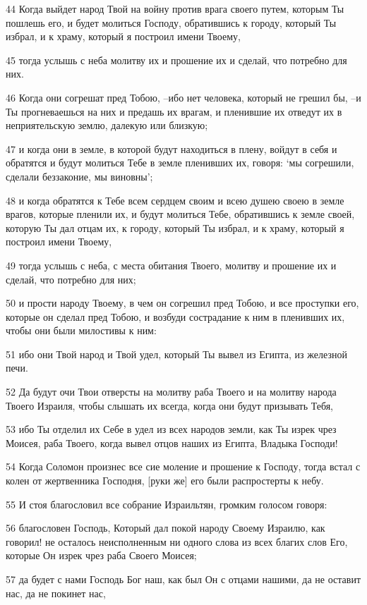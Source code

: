 \par 44 Когда выйдет народ Твой на войну против врага своего путем, которым Ты пошлешь его, и будет молиться Господу, обратившись к городу, который Ты избрал, и к храму, который я построил имени Твоему,
\par 45 тогда услышь с неба молитву их и прошение их и сделай, что потребно для них.
\par 46 Когда они согрешат пред Тобою, --ибо нет человека, который не грешил бы, --и Ты прогневаешься на них и предашь их врагам, и пленившие их отведут их в неприятельскую землю, далекую или близкую;
\par 47 и когда они в земле, в которой будут находиться в плену, войдут в себя и обратятся и будут молиться Тебе в земле пленивших их, говоря: `мы согрешили, сделали беззаконие, мы виновны';
\par 48 и когда обратятся к Тебе всем сердцем своим и всею душею своею в земле врагов, которые пленили их, и будут молиться Тебе, обратившись к земле своей, которую Ты дал отцам их, к городу, который Ты избрал, и к храму, который я построил имени Твоему,
\par 49 тогда услышь с неба, с места обитания Твоего, молитву и прошение их и сделай, что потребно для них;
\par 50 и прости народу Твоему, в чем он согрешил пред Тобою, и все проступки его, которые он сделал пред Тобою, и возбуди сострадание к ним в пленивших их, чтобы они были милостивы к ним:
\par 51 ибо они Твой народ и Твой удел, который Ты вывел из Египта, из железной печи.
\par 52 Да будут очи Твои отверсты на молитву раба Твоего и на молитву народа Твоего Израиля, чтобы слышать их всегда, когда они будут призывать Тебя,
\par 53 ибо Ты отделил их Себе в удел из всех народов земли, как Ты изрек чрез Моисея, раба Твоего, когда вывел отцов наших из Египта, Владыка Господи!
\par 54 Когда Соломон произнес все сие моление и прошение к Господу, тогда встал с колен от жертвенника Господня, [руки же] его были распростерты к небу.
\par 55 И стоя благословил все собрание Израильтян, громким голосом говоря:
\par 56 благословен Господь, Который дал покой народу Своему Израилю, как говорил! не осталось неисполненным ни одного слова из всех благих слов Его, которые Он изрек чрез раба Своего Моисея;
\par 57 да будет с нами Господь Бог наш, как был Он с отцами нашими, да не оставит нас, да не покинет нас,
